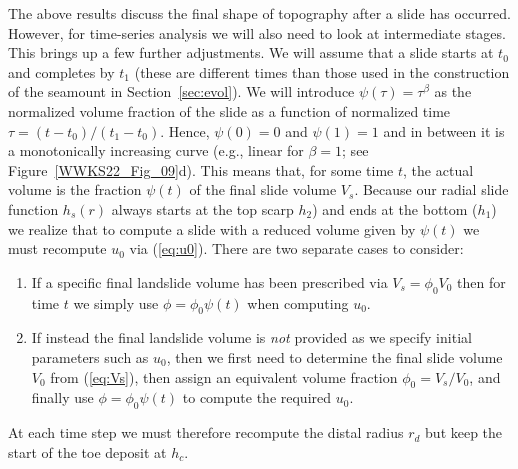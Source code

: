 The above results discuss the final shape of topography after a slide has occurred.  However, for time-series analysis
we will also need to look at intermediate stages.  This brings up a few further adjustments. We will assume that a
slide starts at $t_0$ and completes by $t_1$ (these are different times than those used in the construction of the seamount in Section~\ref{sec:evol}).
We will introduce $\psi(\tau) = \tau^\beta$ as the normalized volume
fraction of the slide as a function of normalized time $\tau = (t - t_0)/(t_1 - t_0)$.  Hence, $\psi(0) = 0$ and
$\psi(1) = 1$ and in between it is a monotonically increasing curve (e.g., linear for $\beta = 1$; see
Figure~\ref{WWKS22_Fig_09}d).  This means that, for some time $t$, the actual volume is the fraction $\psi(t)$ of
the final slide volume $V_s$. Because our radial slide function $h_s(r)$ always starts at the top scarp $h_2$) and
ends at the bottom ($h_1$) we realize that to compute a slide with a reduced volume given by $\psi(t)$ we must
recompute $u_0$ via (\ref{eq:u0}). There are two separate cases to consider:
\begin{enumerate}
  \item If a specific final landslide volume has been prescribed via $V_s = \phi_0 V_0$ then for time $t$ we simply use
  $\phi = \phi_0 \psi(t)$ when computing $u_0$.
  \item If instead the final landslide volume is \emph{not} provided as we specify initial parameters such as $u_0$,
  then we first need to determine the final slide volume $V_0$ from (\ref{eq:Vs}), then assign an
  equivalent volume fraction  $\phi_0 = V_s/V_0$, and finally use $\phi = \phi_0 \psi(t)$ to compute the required
  $u_0$.
\end{enumerate}
At each time step we must therefore recompute the distal radius $r_d$ but keep the start of the toe deposit at $h_c$.

